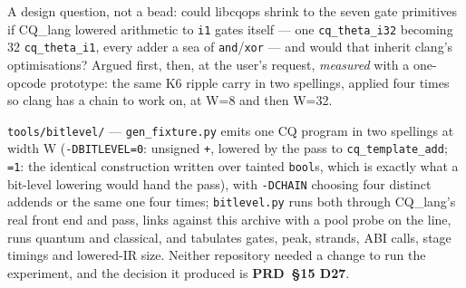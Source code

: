 

\begin{generated}
\end{generated}


A design question, not a bead: could libcqops shrink to the seven gate primitives if CQ\_lang
lowered arithmetic to \texttt{i1} gates itself --- one \texttt{cq\_theta\_i32} becoming 32
\texttt{cq\_theta\_i1}, every adder a sea of \texttt{and}/\texttt{xor} --- and would that inherit
clang's optimisations? Argued first, then, at the user's request, \emph{measured} with a one-opcode
prototype: the same K6 ripple carry in two spellings, applied four times so clang has a chain to
work on, at W=8 and then W=32.

\texttt{tools/bitlevel/} --- \texttt{gen\_fixture.py} emits one CQ program in two spellings at
width W (\texttt{-DBITLEVEL=0}: unsigned \texttt{+}, lowered by the pass to
\texttt{cq\_template\_add}; \texttt{=1}: the identical construction written over tainted
\texttt{bool}s, which is exactly what a bit-level lowering would hand the pass), with
\texttt{-DCHAIN} choosing four distinct addends or the same one four times;
\texttt{bitlevel.py} runs both through CQ\_lang's real front end and pass, links against this
archive with a pool probe on the line, runs quantum and classical, and tabulates gates, peak,
strands, ABI calls, stage timings and lowered-IR size. Neither repository needed a change to run
the experiment, and the decision it produced is \textbf{PRD~\S15 D27}.

